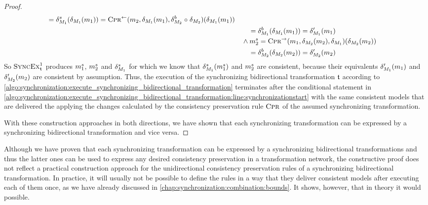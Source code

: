 \begin{proof}
\begin{align*}
        = \change{\metamodel{M}{1}}^{s}(\change{\metamodel{M}{1}}(\model{m}{1})) %
        = \consistencypreservationrule{}^{\leftarrow}(\model{m}{2},\change{\metamodel{M}{1}}(\model{m}{1}),\change{\metamodel{M}{2}}^{b} \concatfunction \change{\metamodel{M}{2}})(\change{\metamodel{M}{1}}(\model{m}{1})) %
        \\
        & \formulaskip\formulaskip
        = \change{\metamodel{M}{1}}^{b}(\change{\metamodel{M}{1}}(\model{m}{1}))
        = \change{\metamodel{M}{1}}'(\model{m}{1}) \\
        & \formulaskip
        \land
        \model{m}{2}^{s}
        = \consistencypreservationrule{}^{\rightarrow}(\model{m}{1},\change{\metamodel{M}{2}}(\model{m}{2}),\change{\metamodel{M}{1}})(\change{\metamodel{M}{2}}(\model{m}{2})) %
        \\
        & \formulaskip\formulaskip
        = \change{\metamodel{M}{2}}^{b}(\change{\metamodel{M}{2}}(\model{m}{2})) %
        = \change{\metamodel{M}{2}}'(\model{m}{2})
    \end{align*}
    So $\function{SyncEx}_{\transformation{t}}^1$ produces $\model{m}{1}^{s}$, $\model{m}{2}^{s}$ and $\change{\metamodel{M}{1}}^{s}$ for which we know that $\change{\metamodel{M}{1}}^{s}(\model{m}{1}^{s})$ and $\model{m}{2}^{s}$ are consistent, because their equivalents $\change{\metamodel{M}{1}}'(\model{m}{1})$ and $\change{\metamodel{M}{2}}'(\model{m}{2})$ are consistent by assumption.
    Thus, the execution of the synchronizing bidirectional transformation $\transformation{t}$ according to \autoref{algo:synchronization:execute_synchronizing_bidirectional_transformation} terminates after the conditional statement in \autoref{algo:synchronization:execute_synchronizing_bidirectional_transformation:line:synchronizationstart} with the same consistent models that are delivered the applying the changes calculated by the consistency preservation rule $\textsc{Cpr}_{}$ of the assumed synchronizing transformation.

    With these construction approaches in both directions, we have shown that each synchronizing transformation can be expressed by a synchronizing bidirectional transformation and vice versa.
\end{proof}

Although we have proven that each synchronizing transformation can be expressed by a synchronizing bidirectional transformations and thus the latter ones can be used to express any desired consistency preservation in a transformation network, the constructive proof does not reflect a practical construction approach for the unidirectional consistency preservation rules of a synchronizing bidirectional transformation.
In practice, it will usually not be possible to define the rules in a way that they deliver consistent models after executing each of them once, as we have already discussed in \autoref{chap:synchronization:combination:bounds}.
It shows, however, that in theory it would possible.

